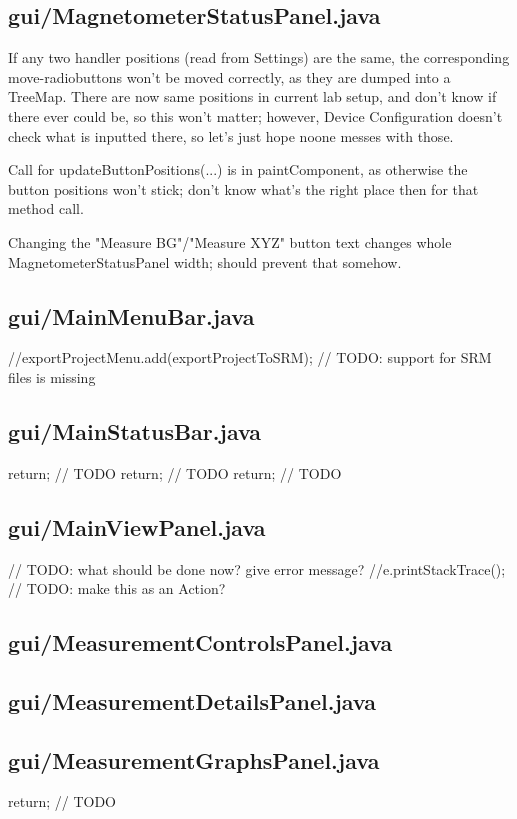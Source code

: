 \subsection{gui/MagnetometerStatusPanel.java}

If any two handler positions (read from Settings) are the same, the corresponding move-radiobuttons won't be moved correctly, as they are dumped into a TreeMap. There are now same positions in current lab setup, and don't know if there ever could be, so this won't matter; however, Device Configuration doesn't check what is inputted there, so let's just hope noone messes with those.

Call for updateButtonPositions(...) is in paintComponent, as otherwise the button positions won't stick; don't know what's the right place then for that method call.

Changing the "Measure BG"/"Measure XYZ" button text changes whole MagnetometerStatusPanel width; should prevent that somehow.

\subsection{gui/MainMenuBar.java}
            //exportProjectMenu.add(exportProjectToSRM);    // TODO: support for SRM files is missing

\subsection{gui/MainStatusBar.java}
        return; // TODO
        return; // TODO
        return; // TODO

\subsection{gui/MainViewPanel.java}
                    // TODO: what should be done now? give error message?
                    //e.printStackTrace();
        // TODO: make this as an Action?

\subsection{gui/MeasurementControlsPanel.java}

\subsection{gui/MeasurementDetailsPanel.java}

\subsection{gui/MeasurementGraphsPanel.java}
        return; // TODO

